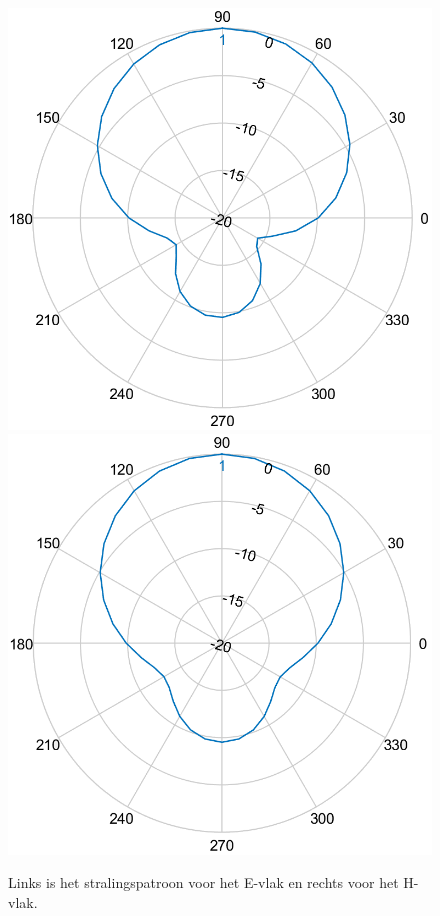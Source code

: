 \documentclass[twocolumn]{phdsymp_dutch}
\begin{document}
\begin{figure}[!htb]
  \includegraphics[width=\linewidth]{pattern2/ep.png} 
\endminipage\hfill
{}%
  \includegraphics[width=\linewidth]{pattern2/hp.png}
\endminipage
  \caption{Links is het stralingspatroon voor het E-vlak en rechts voor het H-vlak.}
\label{fig:radpattern}
\end{figure}
\end{document}
